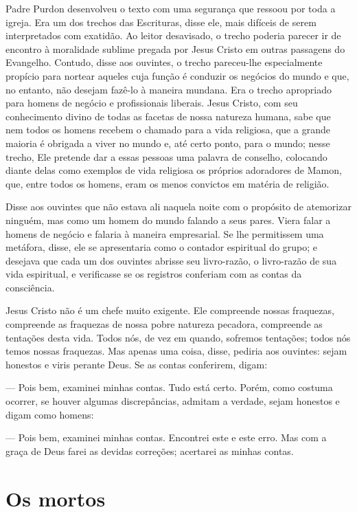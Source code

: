 Padre Purdon desenvolveu o texto com uma segurança que ressoou por
toda a igreja. Era um dos trechos das Escrituras, disse ele, mais
difíceis de serem interpretados com exatidão. Ao leitor desavisado, o
trecho poderia parecer ir de encontro à moralidade sublime pregada por
Jesus Cristo em outras passagens do Evangelho. Contudo, disse aos
ouvintes, o trecho pareceu-lhe especialmente propício para nortear
aqueles cuja função é conduzir os negócios do mundo e que, no
entanto, não desejam fazê-lo à maneira mundana. Era o trecho
apropriado para homens de negócio e profissionais liberais. Jesus
Cristo, com seu conhecimento divino de todas as facetas de nossa
natureza humana, sabe que nem todos os homens recebem o chamado para a
vida religiosa, que a grande maioria é obrigada a viver no mundo e,
até certo ponto, para o mundo; nesse trecho, Ele pretende dar a essas
pessoas uma palavra de conselho, colocando diante delas como exemplos
de vida religiosa os próprios adoradores de Mamon, que, entre todos
os homens, eram os menos convictos em matéria de religião.

Disse aos ouvintes que não estava ali naquela noite com o propósito de
atemorizar ninguém, mas como um homem do mundo falando a seus pares.
Viera falar a homens de negócio e falaria à maneira empresarial. Se
lhe permitissem uma metáfora, disse, ele se apresentaria como o
contador espiritual do grupo; e desejava que cada um dos ouvintes
abrisse seu livro-razão, o livro-razão de sua vida espiritual, e
verificasse se os registros conferiam com as contas da consciência.

Jesus Cristo não é um chefe muito exigente. Ele compreende nossas
fraquezas, compreende as fraquezas de nossa pobre natureza
pecadora, compreende as tentações desta vida. Todos nós, de vez em
quando, sofremos tentações; todos nós temos nossas fraquezas. Mas
apenas uma coisa, disse, pediria aos ouvintes:
sejam honestos e viris perante Deus. Se as contas conferirem, digam:

--- Pois bem, examinei minhas contas. Tudo está certo. Porém, como
costuma ocorrer, se houver algumas discrepâncias, admitam a verdade,
sejam honestos e digam como homens:

--- Pois bem, examinei minhas contas. Encontrei este e este erro. Mas
com a graça de Deus farei as devidas correções; acertarei as minhas
contas.

\chapter{Os mortos}

